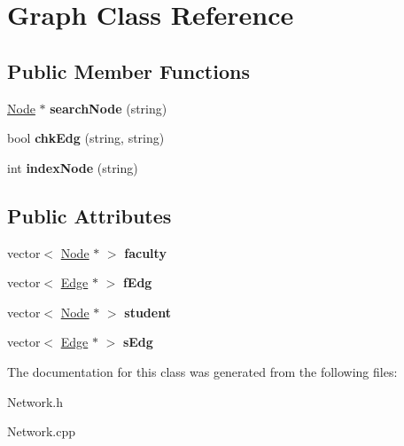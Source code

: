 \hypertarget{classGraph}{\section{\-Graph \-Class \-Reference}
\label{classGraph}
}
\subsection*{\-Public \-Member \-Functions}
\begin{DoxyCompactItemize}
\item 
\hypertarget{classGraph_ac6897cc734d2e37bd70372435b310d19}{\hyperlink{classNode}{\-Node} $\ast$ {\bfseries search\-Node} (string)}\label{classGraph_ac6897cc734d2e37bd70372435b310d19}

\item 
\hypertarget{classGraph_a9c96269194dd251cb3de9c06374229df}{bool {\bfseries chk\-Edg} (string, string)}\label{classGraph_a9c96269194dd251cb3de9c06374229df}

\item 
\hypertarget{classGraph_a1aeef37ce43dcbc213636ccdac4867ea}{int {\bfseries index\-Node} (string)}\label{classGraph_a1aeef37ce43dcbc213636ccdac4867ea}

\end{DoxyCompactItemize}
\subsection*{\-Public \-Attributes}
\begin{DoxyCompactItemize}
\item 
\hypertarget{classGraph_a9e642dad1d22e074707d69d0135e7182}{vector$<$ \hyperlink{classNode}{\-Node} $\ast$ $>$ {\bfseries faculty}}\label{classGraph_a9e642dad1d22e074707d69d0135e7182}

\item 
\hypertarget{classGraph_a0761704a7756d93ec87abd84e887bae1}{vector$<$ \hyperlink{classEdge}{\-Edge} $\ast$ $>$ {\bfseries f\-Edg}}\label{classGraph_a0761704a7756d93ec87abd84e887bae1}

\item 
\hypertarget{classGraph_a216905eb0d521bd1cf89594a95e7aa88}{vector$<$ \hyperlink{classNode}{\-Node} $\ast$ $>$ {\bfseries student}}\label{classGraph_a216905eb0d521bd1cf89594a95e7aa88}

\item 
\hypertarget{classGraph_a8c1c862665311c754db23d8cef44f382}{vector$<$ \hyperlink{classEdge}{\-Edge} $\ast$ $>$ {\bfseries s\-Edg}}\label{classGraph_a8c1c862665311c754db23d8cef44f382}

\end{DoxyCompactItemize}


\-The documentation for this class was generated from the following files\-:\begin{DoxyCompactItemize}
\item 
\-Network.\-h\item 
\-Network.\-cpp\end{DoxyCompactItemize}
